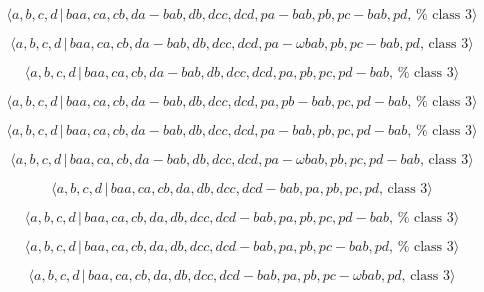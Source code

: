 \documentclass[10pt]{article}
\begin{document}
\begin{equation}
\langle a,b,c,d\,|\,baa,ca,cb,da-bab,db,dcc,dcd,pa-bab,pb,pc-bab,pd,\,\text{%
class }3\rangle  \tag{7.4096}
\end{equation}

\begin{equation}
\langle a,b,c,d\,|\,baa,ca,cb,da-bab,db,dcc,dcd,pa-\omega bab,pb,pc-bab,pd,\,%
\text{class }3\rangle  \tag{7.4097}
\end{equation}

\begin{equation}
\langle a,b,c,d\,|\,baa,ca,cb,da-bab,db,dcc,dcd,pa,pb,pc,pd-bab,\,\text{%
class }3\rangle  \tag{7.4098}
\end{equation}

\begin{equation}
\langle a,b,c,d\,|\,baa,ca,cb,da-bab,db,dcc,dcd,pa,pb-bab,pc,pd-bab,\,\text{%
class }3\rangle  \tag{7.4099}
\end{equation}

\begin{equation}
\langle a,b,c,d\,|\,baa,ca,cb,da-bab,db,dcc,dcd,pa-bab,pb,pc,pd-bab,\,\text{%
class }3\rangle  \tag{7.4100}
\end{equation}

\begin{equation}
\langle a,b,c,d\,|\,baa,ca,cb,da-bab,db,dcc,dcd,pa-\omega bab,pb,pc,pd-bab,\,%
\text{class }3\rangle  \tag{7.4101}
\end{equation}

\begin{equation}
\langle a,b,c,d\,|\,baa,ca,cb,da,db,dcc,dcd-bab,pa,pb,pc,pd,\,\text{class }%
3\rangle  \tag{7.4102}
\end{equation}

\begin{equation}
\langle a,b,c,d\,|\,baa,ca,cb,da,db,dcc,dcd-bab,pa,pb,pc,pd-bab,\,\text{%
class }3\rangle  \tag{7.4103}
\end{equation}

\begin{equation}
\langle a,b,c,d\,|\,baa,ca,cb,da,db,dcc,dcd-bab,pa,pb,pc-bab,pd,\,\text{%
class }3\rangle  \tag{7.4104}
\end{equation}

\begin{equation}
\langle a,b,c,d\,|\,baa,ca,cb,da,db,dcc,dcd-bab,pa,pb,pc-\omega bab,pd,\,%
\text{class }3\rangle  \tag{7.4105}
\end{equation}
\end{document}
